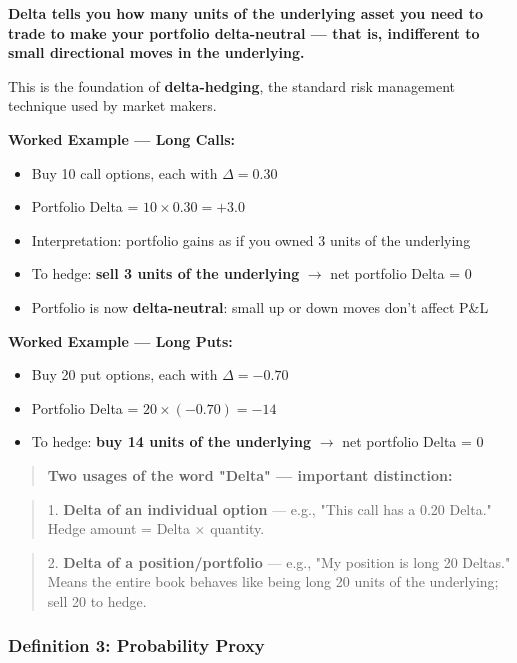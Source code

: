 \documentclass[12pt,openany]{book}
\begin{document}
\textbf{Delta tells you how many units of the underlying asset you need to trade to make your portfolio delta-neutral — that is, indifferent to small directional moves in the underlying.}

This is the foundation of \textbf{delta-hedging}, the standard risk management technique used by market makers.

\textbf{Worked Example — Long Calls:}
\begin{itemize}[leftmargin=*]
    \item Buy 10 call options, each with \(\Delta = 0.30\)
    \item Portfolio Delta = \(10 \times 0.30 = +3.0\)
    \item Interpretation: portfolio gains as if you owned 3 units of the underlying
    \item To hedge: \textbf{sell 3 units of the underlying} \(\rightarrow\) net portfolio Delta = 0
    \item Portfolio is now \textbf{delta-neutral}: small up or down moves don't affect P\&L
\end{itemize}

\textbf{Worked Example — Long Puts:}
\begin{itemize}[leftmargin=*]
    \item Buy 20 put options, each with \(\Delta = -0.70\)
    \item Portfolio Delta = \(20 \times (-0.70) = -14\)
    \item To hedge: \textbf{buy 14 units of the underlying} \(\rightarrow\) net portfolio Delta = 0
\end{itemize}

\begin{quote}
\textbf{Two usages of the word "Delta" — important distinction:}
\end{quote}
\begin{quote}
1. \textbf{Delta of an individual option} — e.g., "This call has a 0.20 Delta." Hedge amount = Delta \(\times\) quantity.
\end{quote}
\begin{quote}
2. \textbf{Delta of a position/portfolio} — e.g., "My position is long 20 Deltas." Means the entire book behaves like being long 20 units of the underlying; sell 20 to hedge.
\end{quote}

\subsubsection{Definition 3: Probability Proxy}
\end{document}
